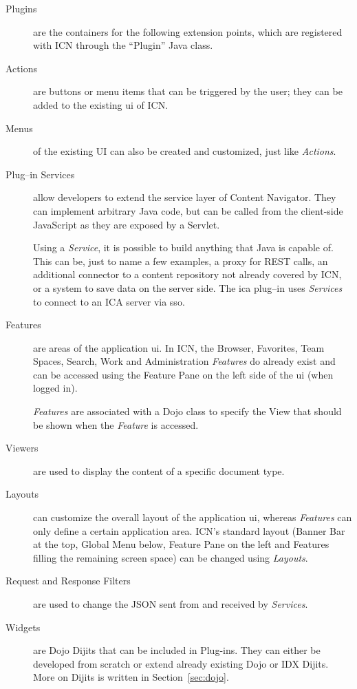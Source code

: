 \begin{description}
	\item[Plugins] are the containers for the following extension points, which are registered with ICN through the ``Plugin'' Java class.
	\item[Actions] are buttons or menu items that can be triggered by the user; they can be added to the existing \ac{ui} of ICN.
	\item[Menus] of the existing UI can also be created and customized, just like \emph{Actions}.
	\item[Plug--in Services] allow developers to extend the service layer of Content Navigator. They can implement arbitrary Java code, but can be called from the client-side JavaScript as they are exposed by a Servlet.

	Using a \emph{Service}, it is possible to build anything that Java is capable of. This can be, just to name a few examples, a proxy for REST calls, an additional connector to a content repository not already covered by ICN, or a system to save data on the server side. The \ac{ica} plug--in uses \emph{Services} to connect to an ICA server via \ac{sso}.
	\item[Features] are areas of the application \ac{ui}. In ICN, the Browser, Favorites, Team Spaces, Search, Work and Administration \emph{Features} do already exist and can be accessed using the Feature Pane on the left side of the \ac{ui} (when logged in).

	\emph{Features} are associated with a Dojo class to specify the View that should be shown when the \emph{Feature} is accessed.
	\item[Viewers] are used to display the content of a specific document type.
	\item[Layouts] can customize the overall layout of the application \ac{ui}, whereas \emph{Features} can only define a certain application area. ICN's standard layout (Banner Bar at the top, Global Menu below, Feature Pane on the left and Features filling the remaining screen space) can be changed using \emph{Layouts}.
	\item[Request and Response Filters] are used to change the JSON sent from and received by \emph{Services}.
	\item[Widgets] are Dojo Dijits that can be included in Plug-ins. They can either be developed from scratch or extend already existing Dojo or IDX Dijits. More on Dijits is written in Section~\ref{sec:dojo}.
\end{description}

